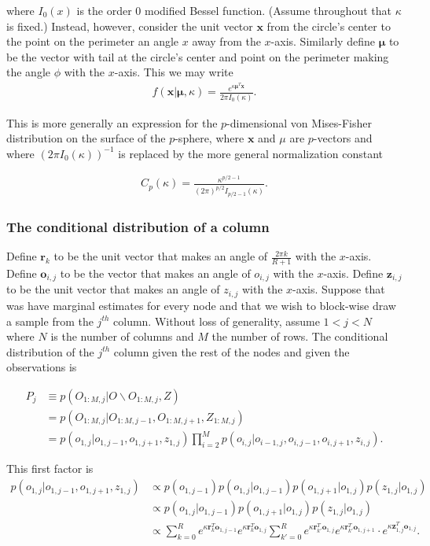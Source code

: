\documentclass[11pt]{article}
\begin{document}
\noindent where $I_0(x)$ is the order 0 modified Bessel function. (Assume throughout that $\kappa$ is fixed.) Instead, however, consider the unit vector $\mathbf{x}$ from the circle's center to the point on the perimeter an angle $x$ away from the $x$-axis. Similarly define $\mathbf{\mu}$ to be the vector with tail at the circle's center and point on the perimeter making the angle $\phi$ with the $x$-axis. This we may write
%
\begin{align*}
f(\mathbf{x}|\mathbf{\mu},\kappa) = \frac{e^{\kappa \mathbf{\mu}^T \mathbf{x}}}{2\pi I_0(\kappa)}.
\end{align*}

\noindent This is more generally an expression for the $p$-dimensional von Mises-Fisher distribution on the surface of the $p$-sphere, where $\mathbf{x}$ and $\mu$ are $p$-vectors and where $(2\pi I_0(\kappa))^{-1}$ is replaced by the more general normalization constant 

\begin{align*}
C_p(\kappa)=\frac{\kappa^{p/2-1}}{(2\pi)^{p/2} I_{p/2-1}(\kappa)}.
\end{align*}

\subsubsection*{The conditional distribution of a column}

Define $\mathbf{r}_k$ to be the unit vector that makes an angle of $\frac{2\pi k}{R+1}$ with the $x$-axis. Define $\mathbf{o}_{i,j}$ to be the vector that makes an angle of $o_{i,j}$ with the $x$-axis. Define $\mathbf{z}_{i,j}$ to be the unit vector that makes an angle of $z_{i,j}$ with the $x$-axis. Suppose that was have marginal estimates for every node and that we wish to block-wise draw a sample from the $j^{th}$ column. Without loss of generality, assume $1<j<N$ where $N$ is the number of columns and $M$ the number of rows. The conditional distribution of the $j^{th}$ column given the rest of the nodes and given the observations is

\begin{align*}
P_j &\equiv p(O_{1:M,j}|O\backslash O_{1:M,j},Z) \\
&= p(O_{1:M,j}|O_{1:M,j-1},O_{1:M,j+1},Z_{1:M,j}) \\
&= p(o_{1,j}|o_{1,j-1},o_{1,j+1},z_{1,j}) \prod_{i=2}^M p(o_{i,j}|o_{i-1,j},o_{i,j-1},o_{i,j+1},z_{i,j}).
\end{align*}

\noindent This first factor is
%
\begin{align*}
p(o_{1,j}|o_{1,j-1},o_{1,j+1},z_{1,j}) &\propto p(o_{1,j-1}) p(o_{1,j}|o_{1,j-1})p(o_{1,j+1}|o_{1,j})p(z_{1,j}|o_{1,j}) \\
&\propto p(o_{1,j}|o_{1,j-1})p(o_{1,j+1}|o_{1,j})p(z_{1,j}|o_{1,j}) \\
&\propto \sum_{k=0}^R e^{\kappa \mathbf{r}_k^T \mathbf{o}_{1,j-1}} e^{\kappa \mathbf{r}_k^T \mathbf{o}_{1,j}}
\sum_{k'=0}^R e^{\kappa \mathbf{r}_{k'}^T \mathbf{o}_{1,j}} e^{\kappa \mathbf{r}_{k'}^T \mathbf{o}_{1,j+1}}
\cdot e^{\kappa \mathbf{z}_{1,j}^T\mathbf{o}_{1,j} }.
\end{align*}
\end{document}
